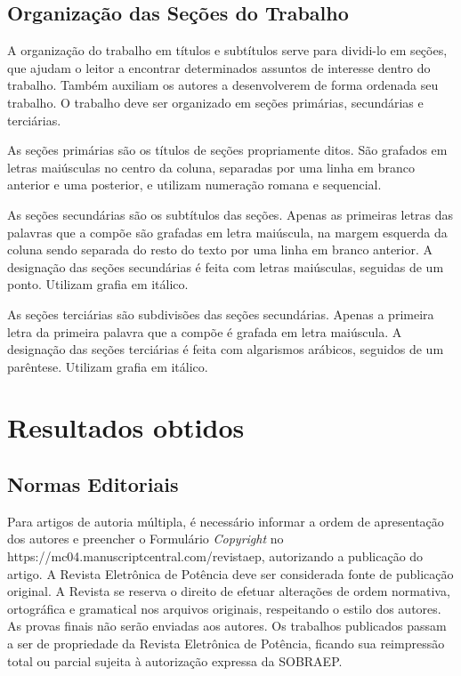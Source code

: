 \documentclass[portugues]{sobraep}
\begin{document}
\subsection{Organização das Seções do Trabalho}

A organização do trabalho em títulos e subtítulos serve para dividi-lo em seções, que ajudam o leitor a encontrar determinados assuntos de interesse dentro do trabalho. Também auxiliam os autores a desenvolverem de forma ordenada seu trabalho. O trabalho deve ser organizado em seções primárias, secundárias e terciárias.

As seções primárias são os títulos de seções propriamente ditos. São grafados em letras maiúsculas no centro da coluna, separadas por uma linha em branco anterior e uma posterior, e utilizam numeração romana e sequencial.

As seções secundárias são os subtítulos das seções. Apenas as primeiras letras das palavras que a compõe são grafadas em letra maiúscula, na margem esquerda da coluna sendo separada do resto do texto por uma linha em branco anterior. A designação das seções secundárias é feita com letras maiúsculas, seguidas de um ponto. Utilizam grafia em itálico.

As seções terciárias são subdivisões das seções secundárias. Apenas a primeira letra da primeira palavra que a compõe é grafada em letra maiúscula. A designação das seções terciárias é feita com algarismos arábicos, seguidos de um parêntese. Utilizam grafia em itálico.


\section{Resultados obtidos}

\subsection{Normas Editoriais}

Para artigos de autoria múltipla, é necessário informar a ordem de apresentação dos autores e preencher o Formulário \textit{Copyright} no https://mc04.manuscriptcentral.com/revistaep, autorizando a publicação do artigo. A Revista Eletrônica de Potência deve ser considerada fonte de publicação original. A Revista se reserva o direito de efetuar alterações de ordem normativa, ortográfica e gramatical nos arquivos originais, respeitando o estilo dos autores. As provas finais não serão enviadas aos autores. Os trabalhos publicados passam a ser de propriedade da Revista Eletrônica de Potência, ficando sua reimpressão total ou parcial sujeita à autorização expressa da SOBRAEP.
\end{document}
